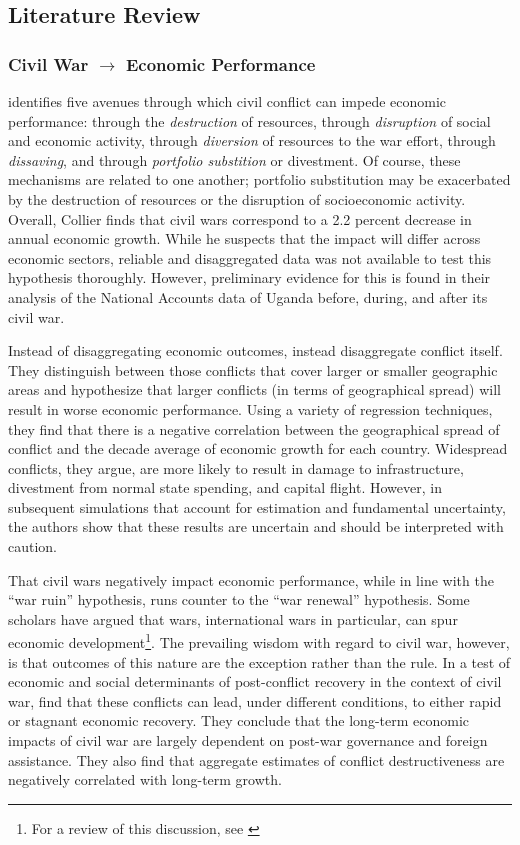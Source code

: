 \subsection{Literature Review}
\label{lit}

\subsubsection{Civil War $\rightarrow$ Economic Performance}

\cite{collier:1999} identifies five avenues through which civil conflict can impede economic performance: through the \textit{destruction} of resources, through \textit{disruption} of social and economic activity, through \textit{diversion} of resources to the war effort, through \textit{dissaving}, and through \textit{portfolio substition} or divestment.  Of course, these mechanisms are related to one another; portfolio substitution may be exacerbated by the destruction of resources or the disruption of socioeconomic activity.  Overall, Collier finds that civil wars correspond to a 2.2 percent decrease in annual economic growth.  While he suspects that the impact will differ across economic sectors, reliable and disaggregated data was not available to test this hypothesis thoroughly.  However, preliminary evidence for this is found in their analysis of the National Accounts data of Uganda before, during, and after its civil war.

Instead of disaggregating economic outcomes, \cite{imai:weinstein:2000} instead disaggregate conflict itself.  They distinguish between those conflicts that cover larger or smaller geographic areas and hypothesize that larger conflicts (in terms of geographical spread) will result in worse economic performance.  Using a variety of regression techniques, they find that there is a negative correlation between the geographical spread of conflict and the decade average of economic growth for each country.  Widespread conflicts, they argue, are more likely to result in damage to infrastructure, divestment from normal state spending, and capital flight.  However, in subsequent simulations that account for estimation and fundamental uncertainty, the authors show that these results are uncertain and should be interpreted with caution.

That civil wars negatively impact economic performance, while in line with the ``war ruin'' hypothesis, runs counter to the ``war renewal'' hypothesis.  Some scholars have argued that wars, international wars in particular, can spur economic development\footnote{For a review of this discussion, see \cite{rasler:thompson:1985}}.  The prevailing wisdom with regard to civil war, however, is that outcomes of this nature are the exception rather than the rule.  In a test of economic and social determinants of post-conflict recovery in the context of civil war, \cite{kang:meernik:2005} find that these conflicts can lead, under different conditions, to either rapid or stagnant economic recovery.  They conclude that the long-term economic impacts of civil war are largely dependent on post-war governance and foreign assistance.  They also find that aggregate estimates of conflict destructiveness are negatively correlated with long-term growth.

